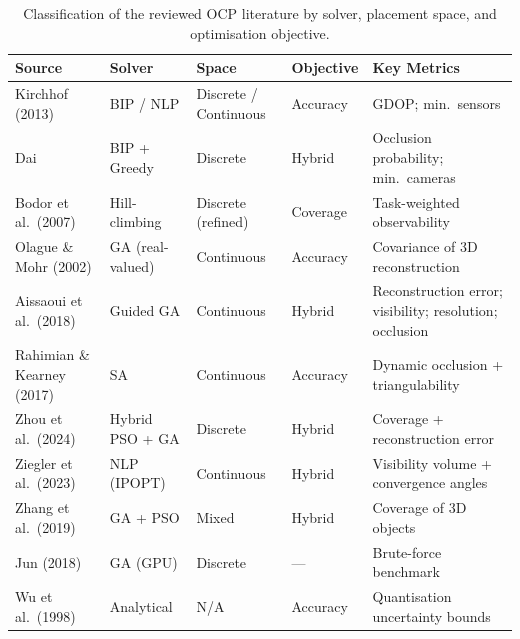 \begin{table}[htbp]
\centering
\caption{Classification of the reviewed \gls{OCP} literature by solver, placement space, and optimisation objective.}
\label{tab:ocp-lit-classification}
\small
\begin{tabularx}{\textwidth}{l l l l X}
\toprule
\textbf{Source} & \textbf{Solver} & \textbf{Space} & \textbf{Objective} & \textbf{Key Metrics} \\
\midrule
Kirchhof (2013) & BIP / NLP & Discrete / Continuous & Accuracy & GDOP; min.\ sensors \\
Dai & BIP + Greedy & Discrete & Hybrid & Occlusion probability; min.\ cameras \\
Bodor et al.\ (2007) & Hill-climbing & Discrete (refined) & Coverage & Task-weighted observability \\
Olague \& Mohr (2002) & GA (real-valued) & Continuous & Accuracy & Covariance of 3D reconstruction \\
Aissaoui et al.\ (2018) & Guided GA & Continuous & Hybrid & Reconstruction error; visibility; resolution; occlusion \\
Rahimian \& Kearney (2017) & SA & Continuous & Accuracy & Dynamic occlusion + triangulability \\
Zhou et al.\ (2024) & Hybrid PSO + GA & Discrete & Hybrid & Coverage + reconstruction error \\
Ziegler et al.\ (2023) & NLP (IPOPT) & Continuous & Hybrid & Visibility volume + convergence angles \\
Zhang et al.\ (2019) & GA + PSO & Mixed & Hybrid & Coverage of 3D objects \\
Jun (2018) & GA (GPU) & Discrete & --- & Brute-force benchmark \\
Wu et al.\ (1998) & Analytical & N/A & Accuracy & Quantisation uncertainty bounds \\
\bottomrule
\end{tabularx}
\end{table}

